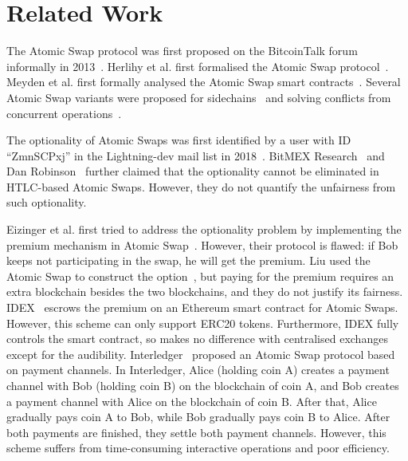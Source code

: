 \section{Related Work}
\label{sec:related_work}

The Atomic Swap protocol was first proposed on the BitcoinTalk forum
informally in 2013~\cite{nolan2013alt}.  Herlihy et al. first
formalised the Atomic Swap protocol~\cite{herlihy2018atomic}.  Meyden
et al. first formally analysed the Atomic Swap smart
contracts~\cite{van2018specification}. Several Atomic Swap variants
were proposed for sidechains~\cite{robinson2019atomic} and solving
conflicts from concurrent operations~\cite{zakhary2019atomic}.

The optionality of Atomic Swaps was first identified by a user with ID
``ZmnSCPxj'' in the Lightning-dev mail list in
2018~\cite{optionality-origin}.  BitMEX
Research~\cite{bitmex-inadvertent-call-option} and Dan
Robinson~\cite{htlcs-considered-harmful} further claimed that the
optionality cannot be eliminated in HTLC-based Atomic Swaps.  However,
they do not quantify the unfairness from such optionality.

Eizinger et al. first tried to address the optionality problem by
implementing the premium mechanism in Atomic
Swap~\cite{first-attempt-optionality}. However, their protocol is
flawed: if Bob keeps not participating in the swap, he will get the
premium.  Liu used the Atomic Swap to construct the
option~\cite{liu2018atomic}, but paying for the premium requires an
extra blockchain besides the two blockchains, and they do not justify
its fairness.
IDEX~\cite{idex-whitepaper} escrows the premium on an Ethereum smart
contract for Atomic Swaps. However, this scheme can only support ERC20
tokens. Furthermore, IDEX fully controls the smart contract, so makes
no difference with centralised exchanges except for the audibility.
Interledger~\cite{interledger-whitepaper} proposed an Atomic Swap
protocol based on payment channels.  In Interledger, Alice (holding
coin A) creates a payment channel with Bob (holding coin B) on the
blockchain of coin A, and Bob creates a payment channel with Alice on
the blockchain of coin B. After that, Alice gradually pays coin A to
Bob, while Bob gradually pays coin B to Alice. After both payments are
finished, they settle both payment channels.  However, this scheme
suffers from time-consuming interactive operations and poor
efficiency.
